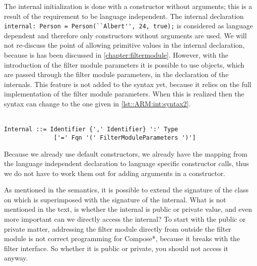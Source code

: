 The internal initialization is done with a constructor without arguments; this is a result of the requirement to be language independent. 
The internal declaration \lstinline!internal: Person = Person(``Albert'', 24, true);! is considered as language dependent and therefore only constructors without arguments are used. 
We will not re-discuss the point of allowing primitive values in the internal declaration, because is has been discussed in \autoref{chapter:filtermodule}.
However, with the introduction of the filter module parameters it is possible to use objects, which are passed through the filter module parameters, in the declaration of the internals.
This feature is not added to the syntax yet, because it relies on the full implementation of the filter module parameters. 
When this is realized then the syntax can change to the one given in \autoref{lst::ARM:int:syntax2}.
\\\\
\begin{lstlisting}[caption = {Proposed internal syntax}, label = lst::ARM:int:syntax2,
style = listing, language = ebnf]
Internal ::= Identifier {',' Identifier} ':' Type 
              ['=' Fqn '(' FilterModuleParameters ')']
\end{lstlisting}
Because we already use default constructors, we already have the mapping from the language independent declaration to language specific constructor calls, thus we do not have to work them out for adding arguments in a constructor.

As mentioned in the semantics, it is possible to extend the signature of the class on which is superimposed with the signature of the internal. 
What is not mentioned in the text, is whether the internal is public or private value, and even more important can we directly access the internal?
To start with the public or private matter, addressing the filter module directly from outside the filter module is not correct programming for Compose*, because it breaks with the filter interface. 
So whether it is public or private, you should not access it anyway.

